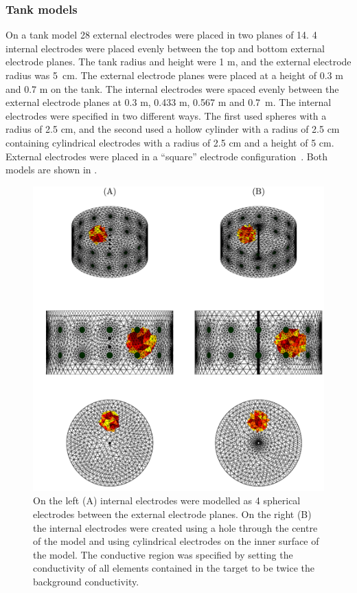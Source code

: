\subsubsection{Tank models}
On a tank model 28 external electrodes were placed in two planes of 14. 
4 internal electrodes were placed evenly between the top and bottom external electrode planes. 
The tank radius and height were 1 m, and the external electrode radius was 5 cm. 
The external electrode planes were placed at a height of 0.3 m and 0.7 m on the tank. 
The internal electrodes were spaced evenly between the external electrode planes 
at 0.3 m, 0.433 m, 0.567 m and 0.7 m. The internal electrodes were specified in 
two different ways. The first used spheres with a radius of 2.5 cm, and the second 
used a hollow cylinder with a radius of 2.5 cm containing cylindrical electrodes
with a radius of 2.5 cm and a height of 5 cm. External electrodes were
placed in a ``square'' electrode configuration~\parencite{grychtol_3d_2016}. 
Both models are shown in .

\begin{figure}
    \centering
   \includegraphics[width=\textwidth]{chapter7-internal_elec_motion/imgs/probe_types.pdf} 
   \caption[Spherical and cylindrical internal electrodes]{\label{fig:probe_types} 
   On the left (A) internal electrodes were modelled as 4 spherical electrodes between the 
   external electrode planes. On the right (B) the internal electrodes were created using 
   a hole through the centre of the model and using cylindrical electrodes on the inner 
   surface of the model.
	The conductive region was specified by setting the conductivity of all elements 
	contained in the target to be twice the background conductivity.}
\end{figure}


